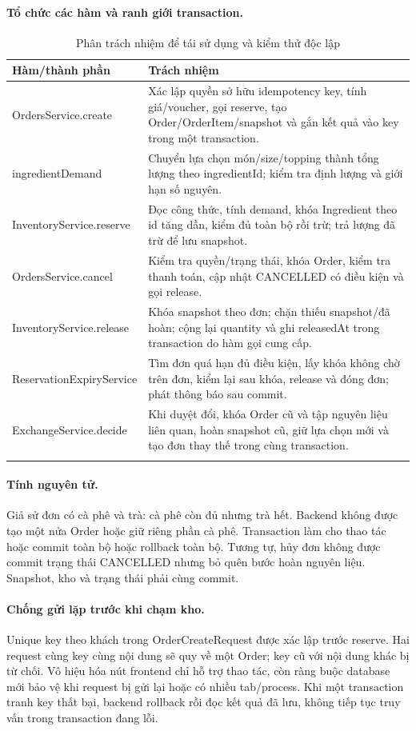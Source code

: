 \paragraph{Tổ chức các hàm và ranh giới transaction.}
\label{sec:inventory-implementation}
\begin{longtable}{|p{.33\linewidth}|p{.58\linewidth}|}
\hline\textbf{Hàm/thành phần} & \textbf{Trách nhiệm}\\\hline\endhead
OrdersService.create & Xác lập quyền sở hữu idempotency key, tính giá/voucher, gọi reserve, tạo Order/OrderItem/snapshot và gắn kết quả vào key trong một transaction.\\\hline
ingredientDemand & Chuyển lựa chọn món/size/topping thành tổng lượng theo ingredientId; kiểm tra định lượng và giới hạn số nguyên.\\\hline
InventoryService.reserve & Đọc công thức, tính demand, khóa Ingredient theo id tăng dần, kiểm đủ toàn bộ rồi trừ; trả lượng đã trừ để lưu snapshot.\\\hline
OrdersService.cancel & Kiểm tra quyền/trạng thái, khóa Order, kiểm tra thanh toán, cập nhật CANCELLED có điều kiện và gọi release.\\\hline
InventoryService.release & Khóa snapshot theo đơn; chặn thiếu snapshot/đã hoàn; cộng lại quantity và ghi releasedAt trong transaction do hàm gọi cung cấp.\\\hline
ReservationExpiryService & Tìm đơn quá hạn đủ điều kiện, lấy khóa không chờ trên đơn, kiểm lại sau khóa, release và đóng đơn; phát thông báo sau commit.\\\hline
ExchangeService.decide & Khi duyệt đổi, khóa Order cũ và tập nguyên liệu liên quan, hoàn snapshot cũ, giữ lựa chọn mới và tạo đơn thay thế trong cùng transaction.\\\hline
\caption{Phân trách nhiệm để tái sử dụng và kiểm thử độc lập}
\end{longtable}

\paragraph{Tính nguyên tử.}
Giả sử đơn có cà phê và trà: cà phê còn đủ nhưng trà hết. Backend không được tạo một nửa Order hoặc giữ riêng phần cà phê. Transaction làm cho thao tác hoặc commit toàn bộ hoặc rollback toàn bộ. Tương tự, hủy đơn không được commit trạng thái CANCELLED nhưng bỏ quên bước hoàn nguyên liệu. Snapshot, kho và trạng thái phải cùng commit.

\paragraph{Chống gửi lặp trước khi chạm kho.}
Unique key theo khách trong OrderCreateRequest được xác lập trước reserve. Hai request cùng key cùng nội dung sẽ quy về một Order; key cũ với nội dung khác bị từ chối. Vô hiệu hóa nút frontend chỉ hỗ trợ thao tác, còn ràng buộc database mới bảo vệ khi request bị gửi lại hoặc có nhiều tab/process. Khi một transaction tranh key thất bại, backend rollback rồi đọc kết quả đã lưu, không tiếp tục truy vấn trong transaction đang lỗi.

